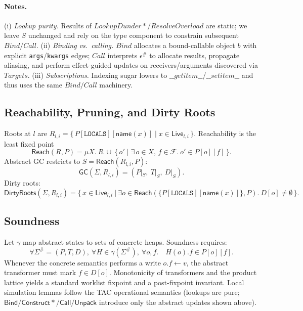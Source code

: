 \paragraph{Notes.}
(i) \emph{Lookup purity.} Results of \(LookupDunder*\)/\(ResolveOverload\) are static; we leave \(S\) unchanged and rely on the type component to constrain subsequent \(Bind/Call\).
(ii) \emph{Binding vs.\ calling.} \(Bind\) allocates a bound-callable object \(b\) with explicit \texttt{args}/\texttt{kwargs} edges; \(Call\) interprets \(\epsilon^\#\) to allocate results, propagate aliasing, and perform effect-guided updates on receivers/arguments discovered via \(Targets\).
(iii) \emph{Subscriptions.} Indexing sugar lowers to \(\_\_getitem\_\_\)/\(\_\_setitem\_\_\) and thus uses the same \(Bind/Call\) machinery.

\subsection{Reachability, Pruning, and Dirty Roots}

Roots at \(l\) are
\(R_{l,i}=\{\,P[\mathtt{LOCALS}][\mathsf{name}(x)] \mid x\in \mathsf{Live}_{l,i}\,\}\).
Reachability is the least fixed point
\[
\mathsf{Reach}(R,P)=\mu X.\ R\ \cup\ \{\,o' \mid \exists\,o\in X,\, f\in\mathcal{F}.\ o'\in P[o][f] \,\}.
\]
Abstract GC restricts to \(S=\mathsf{Reach}(R_{l,i},P)\):
\[
\mathsf{GC}(\Sigma,R_{l,i})=(P|_S,\ T|_S,\ D|_S).
\]
Dirty roots:
\[
\mathsf{DirtyRoots}(\Sigma,R_{l,i})=\big\{\, x\in \mathsf{Live}_{l,i}\ \big|\ \exists o\in \mathsf{Reach}(\{P[\mathtt{LOCALS}][\mathsf{name}(x)]\},P).\ D[o]\neq \emptyset \,\big\}.
\]

\subsection{Soundness}

Let \(\gamma\) map abstract states to sets of concrete heaps. Soundness requires:
\[
\forall \Sigma^\#=(P,T,D),\ \forall H\in \gamma(\Sigma^\#),\ \forall o,f.\quad H(o).f \in P[o][f].
\]
Whenever the concrete semantics performs a write \(o.f\leftarrow v\), the abstract transformer must
mark \(f\in D[o]\). Monotonicity of transformers and the product lattice yields a standard
worklist fixpoint and a post-fixpoint invariant. Local simulation lemmas follow the TAC
operational semantics (lookups are pure; \(\mathsf{Bind}/\mathsf{Construct*}/\mathsf{Call}/\mathsf{Unpack}\) introduce only the abstract updates shown above).
